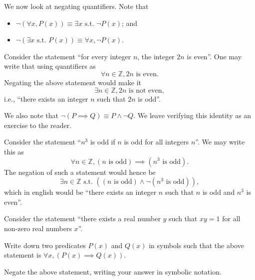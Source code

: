We now look at negating quantifiers. Note that
\begin{itemize}
    \item $\lnot(\forall x, P(x)) \equiv \exists x \text{ s.t. } \lnot P(x)$; and
    \item $\lnot(\exists x \text{ s.t. } P(x)) \equiv \forall x, \lnot P(x)$.
\end{itemize}
\begin{example}
    Consider the statement ``for every integer $n$, the integer $2n$ is even''. One may write that using quantifiers as
    \[
        \forall n \in\mathbb{Z}, 2n \text{ is even}.
    \]
    Negating the above statement would make it
    \[
        \exists n \in \mathbb{Z}, 2n \text{ is not even},
    \]
    i.e., ``there exists an integer $n$ such that $2n$ is odd''.
\end{example}

We also note that $\lnot(P \implies Q) \equiv P \land \lnot Q$. We leave verifying this identity as an exercise to the reader.

\begin{example}
    Consider the statement ``$n^3$ is odd if $n$ is odd for all integers $n$''. We may write this as
    \[
        \forall n \in \mathbb{Z}, (n \text{ is odd}) \implies (n^3 \text{ is odd}).
    \]
    The negation of such a statement would hence be
    \[
        \exists n \in \mathbb{Z} \text{ s.t. }((n \text{ is odd}) \land \lnot(n^3 \text{ is odd})),
    \]
    which in english would be ``there exists an integer $n$ such that $n$ is odd and $n^3$ is even''.
\end{example}

\begin{exercise}
    Consider the statement ``there exists a real number $y$ such that $xy = 1$ for all non-zero real numbers $x$''.
    \begin{partquestions}{\roman*}
        \item Write down two predicates $P(x)$ and $Q(x)$ in symbols such that the above statement is $\forall x,(P(x) \implies Q(x))$.
        \item Negate the above statement, writing your answer in symbolic notation.
    \end{partquestions}
\end{exercise}

